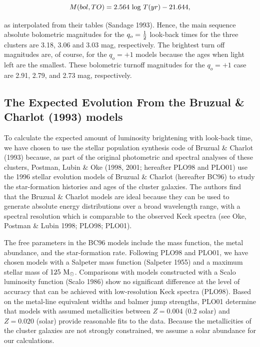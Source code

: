 \documentclass[preprint]{aastex}
\begin{document}
\begin{equation}
        M(bol,TO) = 2.564~{\rm log}~T(yr) - 21.644,
\end{equation}

\noindent as interpolated from their tables (Sandage 1993). Hence, the
main sequence absolute bolometric magnitudes for the $q_o =
{1\over{2}}$ look-back times for the three clusters are 3.18, 3.06 and
3.03 mag, respectively. The brightest turn off magnitudes are, of
course, for the $q_o = +1$ models because the ages when light left are
the smallest. These bolometric turnoff magnitudes for the $q_o = +1$
case are 2.91, 2.79, and 2.73 mag, respectively.


\subsection{The Expected Evolution From the Bruzual \& Charlot 
(1993) models}

To calculate the expected amount of luminosity brightening with
look-back time, we have chosen to use the stellar population synthesis
code of Bruzual \& Charlot (1993) because, as part of the original
photometric and spectral analyses of these clusters, Postman, Lubin \&
Oke (1998, 2001; hereafter PLO98 and PLO01) use the 1996 stellar
evolution models of Bruzual \& Charlot (hereafter BC96) to study the
star-formation histories and ages of the cluster galaxies.  The
authors find that the Bruzual \& Charlot models are ideal because they
can be used to generate absolute energy distributions over a broad
wavelength range, with a spectral resolution which is comparable to
the observed Keck spectra (see Oke, Postman \& Lubin 1998; PLO98;
PLO01).

The free parameters in the BC96 models include the mass function, the
metal abundance, and the star-formation rate.  Following PLO98 and
PLO01, we have chosen models with a Salpeter mass function (Salpeter
1955) and a maximum stellar mass of $125~{\rm M_\odot}$.  Comparisons
with models constructed with a Scalo luminosity function (Scalo 1986)
show no significant difference at the level of accuracy that can be
achieved with low-resolution Keck spectra (PLO98).  Based on the
metal-line equivalent widths and balmer jump strengths, PLO01
determine that models with assumed metallicities between $Z = 0.004$
(0.2 solar) and $Z = 0.020$ (solar) provide reasonable fits to the
data. Because the metallicities of the cluster galaxies are not
strongly constrained, we assume a solar abundance for our
calculations.
\end{document}
